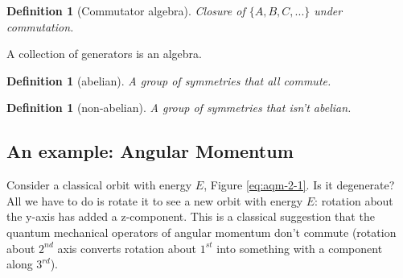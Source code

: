 \documentclass[]{article}
\newtheorem{defn}[thm]{Definition}
\begin{document}
\begin{defn}[Commutator algebra]
	Closure of $\{A,B,C,...\}$ under commutation.
\end{defn}

A collection of generators is an algebra.

\begin{defn}[abelian]
	A group of symmetries that all commute.
\end{defn}

\begin{defn}[non-abelian]
	A group of symmetries that isn't abelian.
\end{defn}

\subsection{An example: Angular Momentum}

Consider a classical orbit with energy $E$, Figure \ref{eq:aqm-2-1}. Is it degenerate? All we have to do is rotate it to see a new orbit with energy $E$: rotation about the y-axis has added a z-component. This is a classical suggestion that the quantum mechanical operators of angular momentum don't commute (rotation about $2^{nd}$ axis converts rotation about $1^{st}$ into something with a component along $3^{rd}$).
\end{document}
